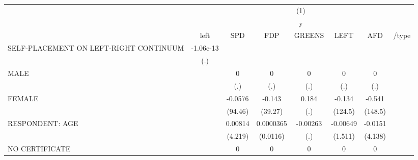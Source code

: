 {
\def\sym#1{\ifmmode^{#1}\else\(^{#1}\)\fi}
\begin{tabular}{l*{7}{c}}
\hline\hline
                              &\multicolumn{7}{c}{(1)}                                                                                                                    \\
                              &\multicolumn{7}{c}{y}                                                                                                                      \\
                              &      left         &       SPD         &       FDP         &    GREENS         &      LEFT         &       AFD         &     /type         \\
\hline
SELF-PLACEMENT ON LEFT-RIGHT CONTINUUM& -1.06e-13         &                   &                   &                   &                   &                   &                   \\
                              &       (.)         &                   &                   &                   &                   &                   &                   \\
[1em]
MALE                          &                   &         0         &         0         &         0         &         0         &         0         &                   \\
                              &                   &       (.)         &       (.)         &       (.)         &       (.)         &       (.)         &                   \\
[1em]
FEMALE                        &                   &   -0.0576         &    -0.143         &     0.184         &    -0.134         &    -0.541         &                   \\
                              &                   &   (94.46)         &   (39.27)         &       (.)         &   (124.5)         &   (148.5)         &                   \\
[1em]
RESPONDENT: AGE               &                   &   0.00814         & 0.0000365         &  -0.00263         &  -0.00649         &   -0.0151         &                   \\
                              &                   &   (4.219)         &  (0.0116)         &       (.)         &   (1.511)         &   (4.138)         &                   \\
[1em]
NO CERTIFICATE                &                   &         0         &         0         &         0         &         0         &         0         &                   \\

\end{tabular}}
